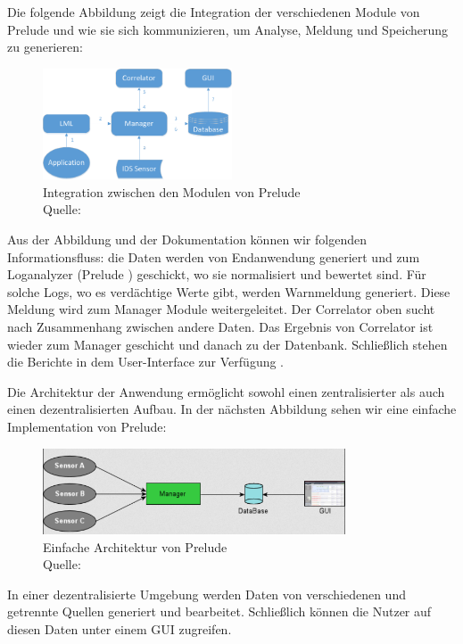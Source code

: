 Die folgende Abbildung zeigt die Integration der verschiedenen Module von Prelude und wie sie sich kommunizieren, um Analyse, Meldung und Speicherung zu generieren:

\begin{figure}[H]
   \centering
   \includegraphics[width=0.5\textwidth]{assets/2_p3.png}
   \caption{Integration zwischen den Modulen von Prelude \\Quelle: \citep{Prelude_MU} }
   \centering
\end{figure}

Aus der Abbildung und der Dokumentation können wir folgenden Informationsfluss: die Daten werden von Endanwendung generiert und zum Loganalyzer (Prelude ) geschickt, wo sie normalisiert und bewertet sind. Für solche Logs, wo es verdächtige Werte gibt, werden Warnmeldung generiert. Diese Meldung wird zum Manager Module weitergeleitet. Der Correlator oben sucht nach Zusammenhang zwischen andere Daten. Das Ergebnis von Correlator ist wieder zum Manager geschicht und danach zu der Datenbank. Schließlich stehen die Berichte in dem User-Interface zur Verfügung \citep{Prelude_Doc}.

Die Architektur der Anwendung ermöglicht sowohl einen zentralisierter als auch einen dezentralisierten Aufbau. In der nächsten Abbildung sehen wir eine einfache Implementation von Prelude: 

\begin{figure}[H]
   \centering
   \includegraphics[width=0.8\textwidth]{assets/2_p4.png}
   \caption{Einfache Architektur von Prelude \\Quelle: \citep{Prelude_MU} }
   \centering
\end{figure}

In einer dezentralisierte Umgebung werden Daten von verschiedenen und getrennte Quellen generiert und bearbeitet. Schließlich können die Nutzer auf diesen Daten unter einem \gls{GUI} zugreifen.

